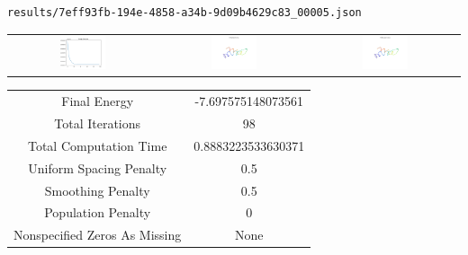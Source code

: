 \documentclass{report}
\begin{document}
\begin{lstlisting}
results/7eff93fb-194e-4858-a34b-9d09b4629c83_00005.json
\end{lstlisting}
\begin{tabular}{ccc}
\includegraphics[width=0.32\textwidth]{7eff93fb-194e-4858-a34b-9d09b4629c83_00005_energies.png}
&
\includegraphics[width=0.32\textwidth]{7eff93fb-194e-4858-a34b-9d09b4629c83_00005_initial_curves.png}
&
\includegraphics[width=0.32\textwidth]{7eff93fb-194e-4858-a34b-9d09b4629c83_00005_estimated_curves.png}
\\
\end{tabular}
\begin{tabular}{cc}
Final Energy&-7.697575148073561\\
Total Iterations&98\\
Total Computation Time&0.8883223533630371\\
Uniform Spacing Penalty&0.5\\
Smoothing Penalty&0.5\\
Population Penalty&0\\
Nonspecified Zeros As Missing&None\\
\end{tabular}
\end{document}
